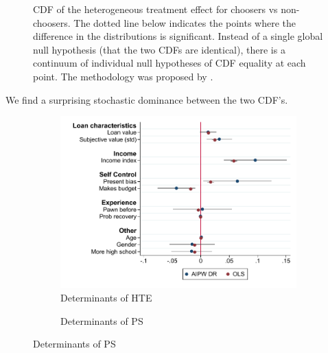 \documentclass[oneside,11pt]{article}
\begin{document}
\begin{figure}[H]
\begin{center}
    \end{center}
     \scriptsize    CDF of the heterogeneous treatment effect for choosers vs non-choosers. The dotted line below indicates the points where the difference in the distributions is significant.  Instead of a single global null hypothesis (that the two CDFs are identical), there is a continuum of individual null hypotheses of CDF equality at each point. The methodology was proposed by \cite{GOLDMAN2018143}.

 

\end{figure}

We find a surprising  stochastic dominance between the two CDF's.

\begin{figure}[H]
    \caption{}
    \label{}
    \begin{center}
    \begin{subfigure}{0.475\textwidth}
        \caption{Determinants of HTE}
        \centering
        \includegraphics[width=\textwidth]{Figuras/HE/he_int_vertical_eff_cost_loan_pro_2.pdf}
    \end{subfigure}
    \begin{subfigure}{0.475\textwidth}
        \caption{Determinants of PS}
        \centering

\end{subfigure}
\end{center}
\end{figure}
\end{document}
